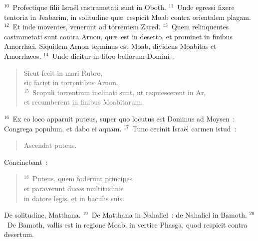 ${}^{10}$~Profectique filii Isra\"el castrametati sunt in Oboth.
${}^{11}$~Unde egressi fixere tentoria in Jeabarim, in solitudine qu\ae\ respicit Moab contra orientalem plagam.
${}^{12}$~Et inde moventes, venerunt ad torrentem Zared.
${}^{13}$~Quem relinquentes castrametati sunt contra Arnon, qu\ae\ est in deserto, et prominet in finibus Amorrh\ae i. Siquidem Arnon terminus est Moab, dividens Moabitas et Amorrh\ae os.
${}^{14}$~Unde dicitur in libro bellorum Domini~: \begin{flushleft}\begin{verse}Sicut fecit in mari Rubro,\\ sic faciet in torrentibus Arnon.\\
${}^{15}$~Scopuli torrentium inclinati sunt, ut requiescerent in Ar,\\ et recumberent in finibus Moabitarum.\end{verse}\end{flushleft}


${}^{16}$~Ex eo loco apparuit puteus, super quo locutus est Dominus ad Moysen~: Congrega populum, et dabo ei aquam.
${}^{17}$~Tunc cecinit Isra\"el carmen istud~: \begin{flushleft}\begin{verse}Ascendat puteus.\end{verse}\end{flushleft}

 Concinebant~:
\begin{flushleft}\begin{verse}${}^{18}$~Puteus, quem foderunt principes\\ et paraverunt duces multitudinis\\ in datore legis, et in baculis suis.\end{verse}\end{flushleft}

 De solitudine, Matthana.
${}^{19}$~De Matthana in Nahaliel~: de Nahaliel in Bamoth.
${}^{20}$~De Bamoth, vallis est in regione Moab, in vertice Phasga, quod respicit contra desertum.


